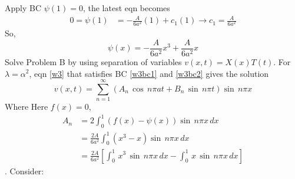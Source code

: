 Apply BC $\psi(1)=0$, the latest eqn becomes
\begin{align*}
0=\psi(1)&=-\frac{A}{6a^2}(1)+c_1(1)\to c_1=\frac{A}{6a^2}
\end{align*}
So, 
\begin{equation}
\psi(x)=-\frac{A}{6a^2}x^3+\frac{A}{6a^2}x\label{psi1}
\end{equation}
Solve Problem B by using separation of variables $v(x,t)=X(x)T(t)$. For $\lambda=\alpha^2$,  eqn \eqref{w3} that satisfies BC \eqref{w3bc1} and \eqref{w3bc2} gives the solution
\begin{equation}
v(x,t)=\sum_{n=1}^\infty\left(A_n\,\cos\,n\pi a t+B_n\,\sin\,n\pi t\right)\sin\,n\pi x\label{s2}
\end{equation}
Where
Here $f(x)=0$, 
\begin{align}
A_n&=2\int_0^1(f(x)-\psi(x))\sin\,n\pi x\,dx\nonumber\\
&=\frac{2A}{6a^2}\int_0^1(x^3-x)\sin\,n\pi x\,dx\nonumber\\
&=\frac{2A}{6a^2}\left[\int_0^1\,x^3\,\sin\,n\pi x\,dx-\int_0^1\,x\,\sin\,n\pi x\,dx\right]\label{s1}
\end{align}.
Consider:
